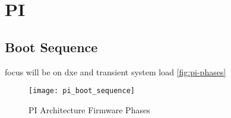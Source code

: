 
\section{\acf{PI}}

\subsection{Boot Sequence}


focus will be on dxe and transient system load
\autoref{fig:pi-phases}



\begin{figure}[htb]%
    \centering%
    \texttt{[image: pi\_boot\_sequence]}%
    \caption{\ac{PI} Architecture Firmware Phases\cite[Figure 2-1]{pi-spec}}%
    \label{fig:pi-phases}%
\end{figure}


